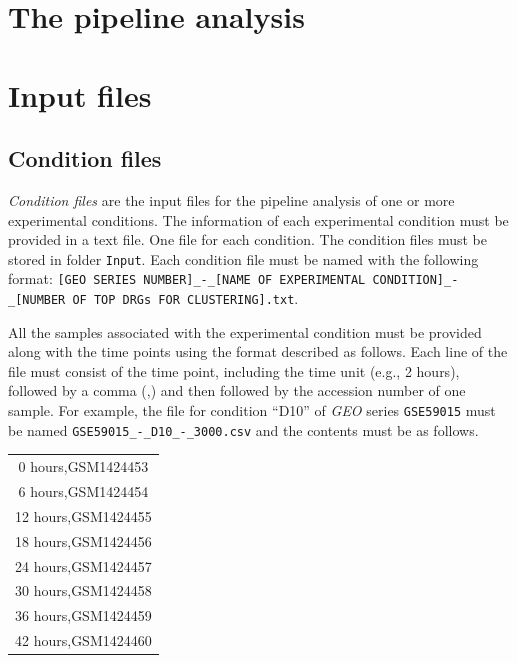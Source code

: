 \documentclass[final,letterpaper,twoside,12pt]{article}
\begin{document}
\section{The pipeline analysis}
\label{section:pipeline}


\section{Input files}
\label{section:input_files}

\subsection{Condition files}
\label{section:condition_files}

\par \emph{Condition files} are the input files for the pipeline analysis of one or more experimental conditions. The information of each experimental condition must be provided in a text file. One file for each condition. The condition files must be stored in folder \texttt{Input}. Each condition file must be named with the following format: \texttt{[GEO SERIES NUMBER]\_-\_[NAME OF EXPERIMENTAL CONDITION]\_-\_[NUMBER OF TOP DRGs FOR CLUSTERING].txt}.

\par All the samples associated with the experimental condition must be provided along with the time points using the format described as follows. Each line of the file must consist of the time point, including the time unit (e.g., 2 hours), followed by a comma (,) and then followed by the accession number of one sample. For example, the file for condition ``D10'' of \textit{GEO} series \texttt{GSE59015} must be named \texttt{GSE59015\_-\_D10\_-\_3000.csv} and the contents must be as follows.

\begin{center}
\begin{tabular}{ c }

0 hours,GSM1424453 \\
6 hours,GSM1424454 \\
12 hours,GSM1424455 \\
18 hours,GSM1424456 \\
24 hours,GSM1424457 \\
30 hours,GSM1424458 \\
36 hours,GSM1424459 \\
42 hours,GSM1424460 \\

\end{tabular}
\end{center}
\end{document}
